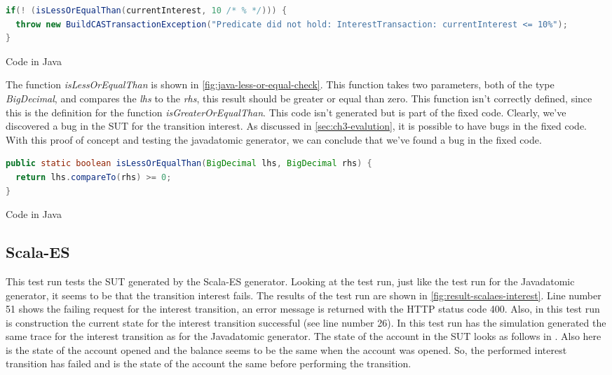 \begin{sourcecode}[h!]
\begin{lstlisting}[language=Java]
if(! (isLessOrEqualThan(currentInterest, 10 /* % */))) {
  throw new BuildCASTransactionException("Predicate did not hold: InterestTransaction: currentInterest <= 10%");
}
\end{lstlisting}
\caption{Code in Java}
\label{fig:java-gen-interest-pre}
\end{sourcecode}

The function \textit{isLessOrEqualThan} is shown in \autoref{fig:java-less-or-equal-check}. This function takes two parameters, both of the type \textit{BigDecimal}, and compares the \textit{lhs} to the \textit{rhs}, this result should be greater or equal than zero. This function isn't correctly defined, since this is the definition for the function \textit{isGreaterOrEqualThan}. This code isn't generated but is part of the fixed code. Clearly, we've discovered a bug in the SUT for the transition interest. As discussed in \autoref{sec:ch3-evalution}, it is possible to have bugs in the fixed code. With this proof of concept and testing the javadatomic generator, we can conclude that we've found a bug in the fixed code.

\begin{sourcecode}[h!]
\begin{lstlisting}[language=Java]
public static boolean isLessOrEqualThan(BigDecimal lhs, BigDecimal rhs) {
  return lhs.compareTo(rhs) >= 0;
}
\end{lstlisting}
\caption{Code in Java}
\label{fig:java-less-or-equal-check}
\end{sourcecode}

\subsection{Scala-ES}
\label{sec:bug-interest-scalaes}

This test run tests the SUT generated by the Scala-ES generator. Looking at the test run, just like the test run for the Javadatomic generator, it seems to be that the transition interest fails. The results of the test run are shown in \autoref{fig:result-scalaes-interest}. Line number 51 shows the failing request for the interest transition, an error message is returned with the HTTP status code 400. Also, in this test run is construction the current state for the interest transition successful (see line number 26). In this test run has the simulation generated the same trace for the interest transition as for the Javadatomic generator. The state of the account in the SUT looks as follows in \label{fig:interest-opened-account-scalaes-json}. Also here is the state of the account opened and the balance seems to be the same when the account was opened. So, the performed interest transition has failed and is the state of the account the same before performing the transition.


